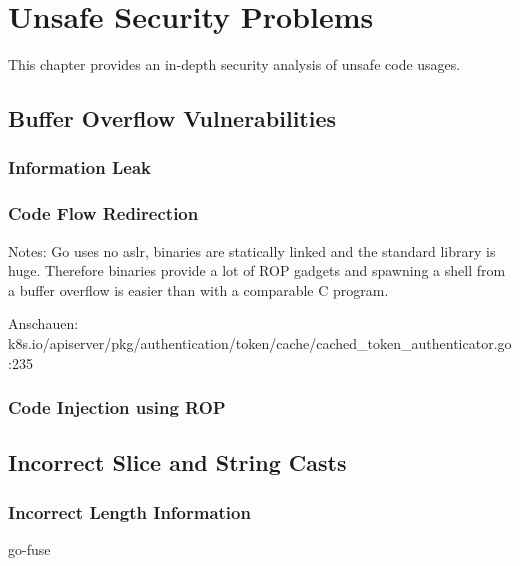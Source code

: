 \chapter{Unsafe Security Problems}\label{ch:unsafe-security-problems}

This chapter provides an in-depth security analysis of unsafe code usages.




\section{Buffer Overflow Vulnerabilities}

\subsection{Information Leak}

\subsection{Code Flow Redirection}

Notes: Go uses no \acrshort{aslr}, binaries are statically linked and the standard library is huge.
Therefore binaries provide a lot of ROP gadgets and spawning a shell from a buffer overflow is easier than with a
comparable C program.

Anschauen: k8s.io/apiserver/pkg/authentication/token/cache/cached\_token\_authenticator.go:235




\subsection{Code Injection using ROP}





\section{Incorrect Slice and String Casts}

\subsection{Incorrect Length Information}

go-fuse

